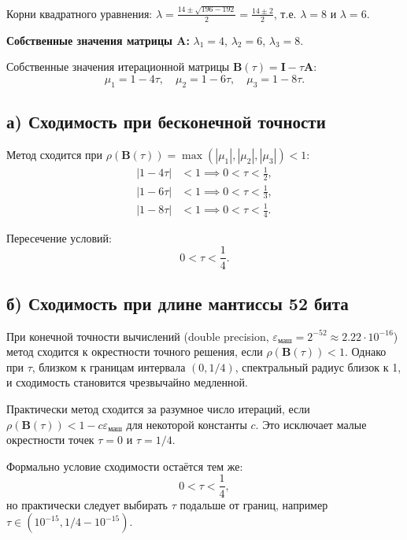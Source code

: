 \documentclass{article}
\begin{document}
Корни квадратного уравнения: $\lambda = \frac{14 \pm \sqrt{196 - 192}}{2} = \frac{14 \pm 2}{2}$, т.е. $\lambda = 8$ и $\lambda = 6$.

\textbf{Собственные значения матрицы $\mathbf{A}$:} $\lambda_1 = 4$, $\lambda_2 = 6$, $\lambda_3 = 8$.

Собственные значения итерационной матрицы $\mathbf{B}(\tau) = \mathbf{I} - \tau\mathbf{A}$:
\begin{equation}
\mu_1 = 1 - 4\tau, \quad \mu_2 = 1 - 6\tau, \quad \mu_3 = 1 - 8\tau.
\end{equation}

\subsection*{а) Сходимость при бесконечной точности}

Метод сходится при $\rho(\mathbf{B}(\tau)) = \max(|\mu_1|, |\mu_2|, |\mu_3|) < 1$:
\begin{align}
|1 - 4\tau| &< 1 \implies 0 < \tau < \frac{1}{2}, \\
|1 - 6\tau| &< 1 \implies 0 < \tau < \frac{1}{3}, \\
|1 - 8\tau| &< 1 \implies 0 < \tau < \frac{1}{4}.
\end{align}

Пересечение условий:
\begin{equation}
\boxed{0 < \tau < \frac{1}{4}.}
\end{equation}

\subsection*{б) Сходимость при длине мантиссы 52 бита}

При конечной точности вычислений (double precision, $\varepsilon_{\text{маш}} = 2^{-52} \approx 2.22 \cdot 10^{-16}$) метод сходится к окрестности точного решения, если $\rho(\mathbf{B}(\tau)) < 1$. Однако при $\tau$, близком к границам интервала $(0, 1/4)$, спектральный радиус близок к 1, и сходимость становится чрезвычайно медленной.

Практически метод сходится за разумное число итераций, если $\rho(\mathbf{B}(\tau)) < 1 - c\varepsilon_{\text{маш}}$ для некоторой константы $c$. Это исключает малые окрестности точек $\tau = 0$ и $\tau = 1/4$.

Формально условие сходимости остаётся тем же:
\begin{equation}
\boxed{0 < \tau < \frac{1}{4},}
\end{equation}
но практически следует выбирать $\tau$ подальше от границ, например $\tau \in (10^{-15}, 1/4 - 10^{-15})$.
\end{document}
